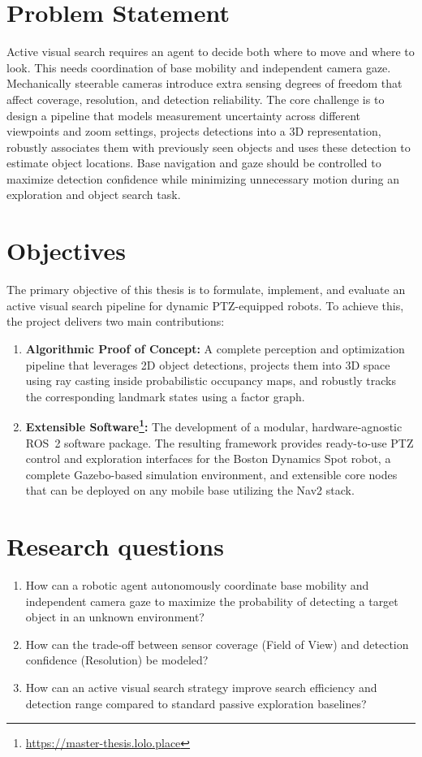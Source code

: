 \documentclass[
	parspace, %
	noindent, %
	final, %
]{elteikthesis}
\begin{document}
\section{Problem Statement}
Active visual search requires an agent to decide both where to move and where to look. This needs coordination of base mobility and independent camera gaze. Mechanically steerable cameras introduce extra sensing degrees of freedom that affect coverage, resolution, and detection reliability. The core challenge is to design a pipeline that models measurement uncertainty across different viewpoints and zoom settings, projects detections into a 3D representation, robustly associates them with previously seen objects and uses these detection to estimate object locations. Base navigation and gaze should be controlled to maximize detection confidence while minimizing unnecessary motion during an exploration and object search task.

\section{Objectives}
The primary objective of this thesis is to formulate, implement, and evaluate an active visual search pipeline for dynamic PTZ-equipped robots. To achieve this, the project delivers two main contributions:
\begin{enumerate}
    \item \textbf{Algorithmic Proof of Concept:} A complete perception and optimization pipeline that leverages 2D object detections, projects them into 3D space using ray casting inside probabilistic occupancy maps, and robustly tracks the corresponding landmark states using a factor graph.
    \item \textbf{Extensible Software\footnote{\url{https://master-thesis.lolo.place}}:} The development of a modular, hardware-agnostic ROS~2 software package. The resulting framework provides ready-to-use PTZ control and exploration interfaces for the Boston Dynamics Spot robot, a complete Gazebo-based simulation environment, and extensible core nodes that can be deployed on any mobile base utilizing the Nav2 stack.
\end{enumerate}

\section{Research questions}

\begin{enumerate}
	\item How can a robotic agent autonomously coordinate base mobility and independent camera gaze to maximize the probability of detecting a target object in an unknown environment?

	\item How can the trade-off between sensor coverage (Field of View) and detection confidence (Resolution) be modeled?

	\item How can an active visual search strategy improve search efficiency and detection range compared to standard passive exploration baselines?
\end{enumerate}
        
\end{document}

